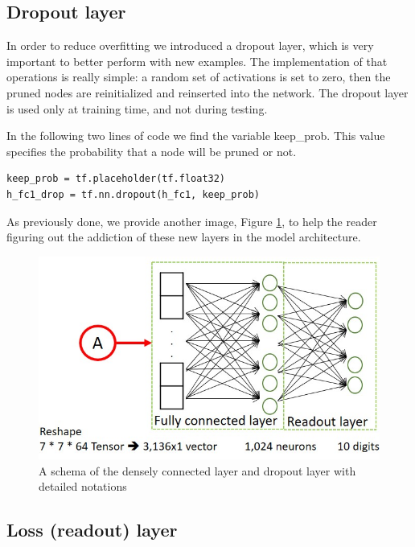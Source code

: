 \subsection{Dropout layer}

In order to reduce overfitting we introduced a dropout layer, which is very important to better perform with new examples. The implementation of that operations is really simple: a random set of activations is set to zero, then the pruned nodes are reinitialized and reinserted into the network. The dropout layer is used only at training time, and not during testing.

In the following two lines of code we find the variable keep_prob. This value specifies the probability that a node will be pruned or not.

\begin{lstlisting}
keep_prob = tf.placeholder(tf.float32)
h_fc1_drop = tf.nn.dropout(h_fc1, keep_prob)
\end{lstlisting}

As previously done, we provide another image, Figure \ref{fig:other_layers}, to help the reader figuring out the addiction of these new layers in the model architecture.

\begin{figure}
	\caption{A schema of the densely connected layer and dropout layer with detailed notations}
	\label{fig:other_layers}
	\centering
	\includegraphics[width=1\textwidth]{Images/other_layers}
\end{figure}

\subsection{Loss (readout) layer}

